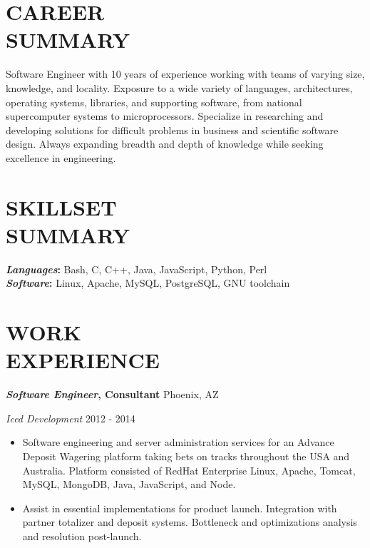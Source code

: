 \documentclass[line,margin]{res}
\renewcommand{\headrulewidth}{0pt} %
\begin{document}
\thispagestyle{empty}


\renewcommand{\headrulewidth}{0pt}

\begin{resume}

  \section{CAREER\\SUMMARY}
  Software Engineer with 10 years of experience working with teams of varying size, knowledge, and locality.
  Exposure to a wide variety of languages, architectures, operating systems, libraries, and supporting
  software, from national supercomputer systems to microprocessors. Specialize in researching and developing
  solutions for difficult problems in business and scientific software design. Always expanding breadth and
  depth of knowledge while seeking excellence in engineering.

  \section{SKILLSET\\SUMMARY}
          {\bf \emph{Languages}:} Bash, C, C++, Java, JavaScript, Python, Perl\\ %
          {\bf \emph{Software}:} Linux, Apache, MySQL, PostgreSQL, GNU toolchain \\ %

  \section{WORK\\EXPERIENCE}
          {\bf \emph{Software Engineer}, Consultant} \hfill Phoenix, AZ

          {\sl Iced Development} \hfill 2012 - 2014
          \begin{itemize} \itemsep -2pt
          \item
            Software engineering and server administration services for an Advance Deposit Wagering platform taking bets on tracks throughout the USA and Australia. Platform consisted of RedHat Enterprise Linux, Apache, Tomcat, MySQL, MongoDB, Java, JavaScript, and Node.
          \item
            Assist in essential implementations for product launch. Integration with partner totalizer and deposit systems. Bottleneck and optimizations analysis and resolution post-launch.
          \end{itemize}


\end{resume}
\end{document}
